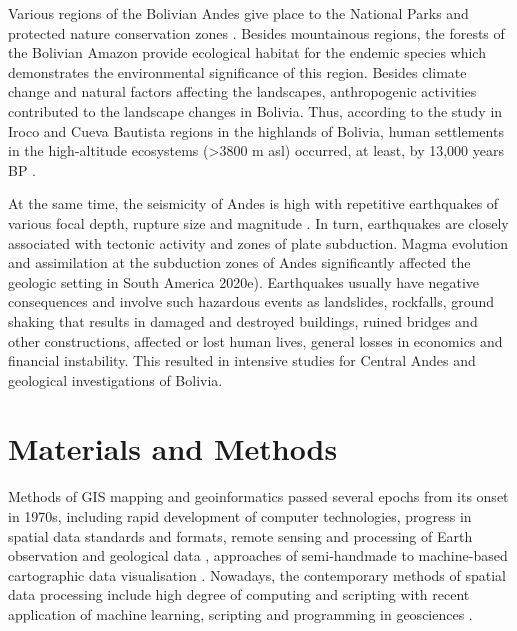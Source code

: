 \documentclass[data,article,submit,pdftex,moreauthors]{Definitions/mdpi}
\begin{document}
Various regions of the Bolivian Andes give place to the National Parks and protected nature conservation zones \cite{Baumannetal2018,Thomasetal,Burbridge}. Besides mountainous regions, the forests of the Bolivian Amazon provide ecological habitat for the endemic species \cite{Cadima} which demonstrates the environmental significance of this region. Besides climate change and natural factors affecting the landscapes, anthropogenic activities contributed to the landscape changes in Bolivia. Thus, according to the study in Iroco and Cueva Bautista regions in the highlands of Bolivia, human settlements in the high-altitude ecosystems (>3800 m asl) occurred, at least, by 13,000 years BP \cite{Capriles}.  

At the same time, the seismicity of Andes is high with repetitive earthquakes of various focal depth, rupture size and magnitude \cite{Rivadeneyra,Tono}. In turn, earthquakes are closely associated with tectonic activity and zones of plate subduction. Magma evolution and assimilation at the subduction zones of Andes significantly affected the geologic setting in South America \cite{Gonzalezetal2020,Lemenkova2019a} 2020e). Earthquakes usually have negative consequences and involve such hazardous events as landslides, rockfalls, ground shaking that results in damaged and destroyed buildings, ruined bridges and other constructions, affected or lost human lives, general losses in economics and financial instability. This resulted in intensive studies for Central Andes and geological investigations of Bolivia.

\section{Materials and Methods}

Methods of GIS mapping and geoinformatics passed several epochs from its onset in 1970s, including rapid development of computer technologies, progress in spatial data standards and formats, remote sensing and processing of Earth observation and geological data \cite{Allenby1987,Lindh2021,Lemenkova202127}, approaches of semi-handmade to machine-based cartographic data visualisation \cite{SchenkeLemenkova}. Nowadays, the contemporary methods of spatial data processing include high degree of computing and scripting with recent application of machine learning, scripting and programming in geosciences \cite{Lietal,Lemenkov2021a,Zhou,Lemenkov2021b}. 
\end{document}
